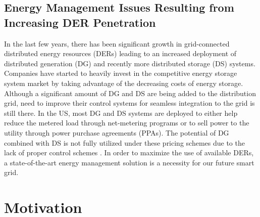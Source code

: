 
\subsection{Energy Management Issues Resulting from Increasing DER Penetration}
In the last few years, there has been significant growth in grid-connected distributed energy resources (DERs) leading to an increased deployment of distributed generation (DG) and recently more distributed storage (DS) systems. Companies have started to heavily invest in the competitive energy storage system market by taking advantage of the decreasing costs of energy storage. Although a significant amount of DG and DS are being added to the distribution grid, need to improve their control systems for seamless integration to the grid is still there. In the US, most DG and DS systems are deployed to either help reduce the metered load through net-metering programs or to sell power to the utility through power purchase agreements (PPAs). The potential of DG combined with DS is not fully utilized under these pricing schemes due to the lack of proper control schemes \cite{CONF_1}. In order to maximize the use of available DERs, a state-of-the-art energy management solution is a necessity for our future smart grid.


\section{Motivation}
